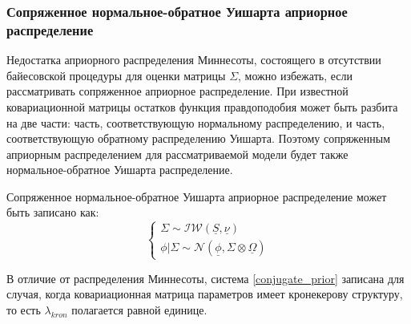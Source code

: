 \documentclass[11pt]{article} %
\newcommand{\cN}{\mathcal{N}}
\newcommand{\cIW}{\mathcal{IW}}
\newcommand{\prior}{\underline}
\begin{document}
\subsubsection{Сопряженное нормальное-обратное Уишарта априорное распределение}

Недостатка априорного распределения Миннесоты, состоящего в отсутствии байесовской процедуры для  оценки матрицы $\Sigma$, можно избежать, если рассматривать сопряженное априорное распределение. При известной ковариационной матрицы остатков функция правдоподобия может быть разбита на две части: часть, соответствующую нормальному распределению, и часть, соответствующую обратному распределению Уишарта. Поэтому сопряженным априорным распределением для рассматриваемой модели будет также нормальное-обратное Уишарта распределение.

Сопряженное нормальное-обратное Уишарта априорное распределение может быть записано как:
\begin{equation}
\begin{cases} \label{conjugate_prior}
\Sigma\sim \cIW(\prior S, \prior \nu) \\
\phi|\Sigma\sim \cN (\prior \phi, \Sigma\otimes\prior \Omega)
\end{cases}
\end{equation}

В отличие от распределения Миннесоты, система \eqref{conjugate_prior} записана для случая, когда ковариационная матрица параметров имеет кронекерову структуру, то есть $\lambda_{kron}$ полагается равной единице.

\end{document}
